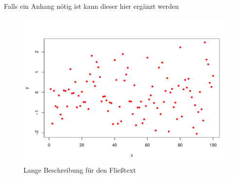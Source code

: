 \documentclass[english,ngerman,BCOR=6mm,cdgeometry=no,DIV=13]{tudscrreprt}
\begin{document}
Falls ein Anhang nötig ist kann dieser hier ergänzt werden

\begin{figure}[h]
	\includegraphics[width=\linewidth]{pdf-plot.pdf}
	\caption[kurze Beschreibung für die Liste der Abbildungen]{Lange Beschreibung für den Fließtext}
\end{figure}
\end{document}
